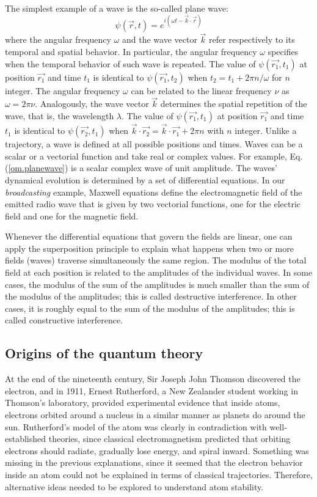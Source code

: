 \documentclass[nofootinbib, secnumarabic, amsmath, nobibnotes,10pt,aps,pra]{revtex4-1}
\newcommand{\eref}[1]{Eq. (\ref{#1})}
\begin{document}
The simplest example of a wave is the so-called plane wave:
\begin{equation} \label{om.planewave}
\psi(\vec{r},t) = e^{i(\omega t- \vec{k} \cdot \vec{r})}
\end{equation}
where the angular frequency $\omega$ and the wave vector $\vec{k}$
refer respectively to its temporal and spatial behavior. In
particular, the angular frequency $\omega$ specifies when the
temporal behavior of such wave is repeated. The value of
$\psi(\vec{r_1},t_1) $ at position $\vec{r_1}$ and time $t_1$ is
identical to $\psi(\vec{r_1},t_2) $ when $t_2 = t_1 + 2 \pi
n/\omega$ for $n$ integer. The angular frequency $\omega$ can be
related to the linear frequency $\nu$ as $ \omega = 2 \pi \nu$.
Analogously, the wave vector $\vec{k}$ determines the spatial
repetition of the wave, that is, the wavelength $\lambda$. The value
of $\psi(\vec{r_1},t_1)$ at position $\vec{r_1}$ and time $t_1$ is
identical to $\psi(\vec{r_2},t_1)$ when $\vec{k}\cdot\vec{r_2} =
\vec{k}\cdot\vec{r_1} + 2 \pi n$ with $n$ integer. Unlike a
trajectory, a wave is defined at all possible positions and times.
Waves can be a scalar or a vectorial function and take real or
complex values. For example, \eref{om.planewave} is a scalar complex
wave of unit amplitude. The waves' dynamical evolution is determined by a set of
differential equations. In our \textit{broadcasting} example,
Maxwell equations define the electromagnetic field of the emitted
radio wave that is given by two vectorial functions, one for the
electric field and one for the magnetic field.

Whenever the differential equations that govern the fields are
linear, one can apply the superposition principle to explain what
happens when two or more fields (waves) traverse simultaneously the
same region. The modulus of the total field at each position is
related to the amplitudes of the individual waves. In some cases,
the modulus of the sum of the amplitudes is much smaller than the
sum of the modulus of the amplitudes; this is called destructive
interference. In other cases, it is roughly equal to the sum of the
modulus of the amplitudes; this is called constructive  interference.

\subsection{Origins of the quantum theory}\label{om.sec_intro.2}

At the end of the nineteenth century, Sir Joseph John Thomson discovered the electron, and in 1911, Ernest Rutherford, a New Zealander student working in Thomson's laboratory, provided experimental evidence that inside atoms, electrons orbited around a nucleus in a similar manner as planets do around the sun.
Rutherford's model of the atom was clearly in contradiction with well-established theories, since classical electromagnetism predicted that orbiting electrons should radiate, gradually lose energy, and spiral inward.
Something was missing in the previous explanations, since it seemed that the electron behavior inside an atom could not be explained in terms of classical trajectories. Therefore, alternative ideas needed to be explored to understand atom stability.
\end{document}
